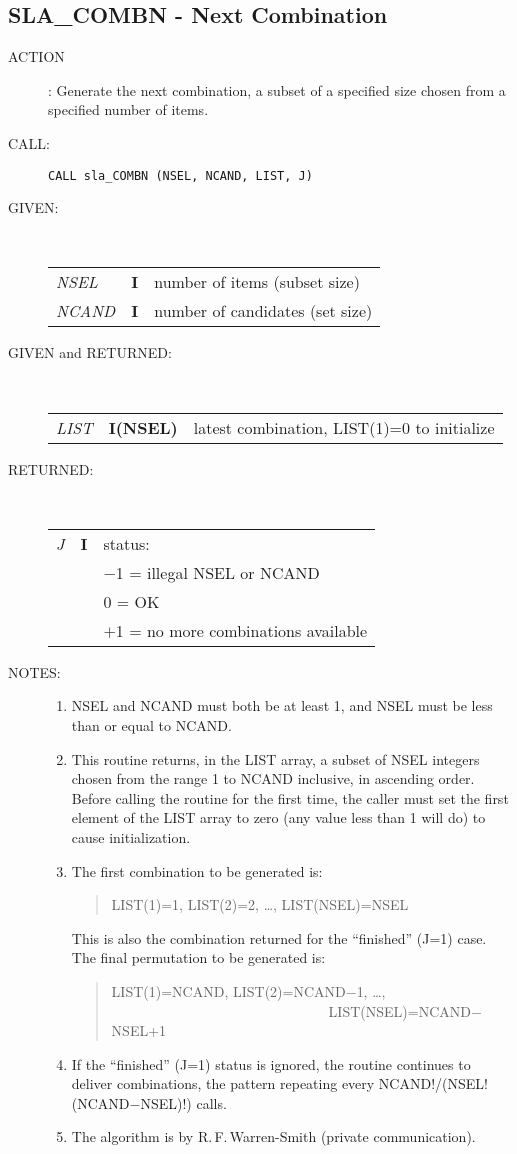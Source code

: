 \documentclass[11pt,twoside]{article}
\newcommand{\xlabel}[1]{}
\newcommand{\routine}[3]
{\hbadness=10000
  \vbox
  {
    \rule{\textwidth}{0.3mm}\\
    {\Large {\bf #1} \hfill #2 \hfill {\bf #1}}\\
    \setlength{\oldspacing}{\topsep}
    \setlength{\topsep}{0.3ex}
    \begin{description}
      #3
    \end{description}
    \setlength{\topsep}{\oldspacing}
  }
}
\renewcommand{\routine}[3]
   {
      \subsection{#1\xlabel{#1} - #2\label{#1}}
       \begin{description}
         #3
       \end{description}
   }
\newcommand{\action}[1]
{\item[ACTION]: #1}
\newcommand{\action}[1]
   {\item[ACTION:] #1}
\newcommand{\call}[1]
{\item[CALL]: \hspace{0.4em}{\tt #1}}
\newlength{\oldspacing}
\renewcommand{\call}[1]
   {
    \item[CALL:] {\tt #1}
   }
\newcommand{\args}[2]
{
  \goodbreak
  \setlength{\oldspacing}{\topsep}
  \setlength{\topsep}{0.3ex}
  \begin{description}
  \item[#1]:\\[1.5ex]
    \begin{tabular}{p{7em}p{6em}p{22em}}
      #2
    \end{tabular}
  \end{description}
  \setlength{\topsep}{\oldspacing}
}
\renewcommand{\args}[2]
   {
     \begin{description}
        \item[#1:]\\
        \begin{tabular}{p{7em}p{6em}l}
           #2
        \end{tabular}
     \end{description}
   }
\newcommand{\spec}[3]
{
  {\em {#1}} & {\bf \mbox{#2}} & {#3}
}
\newcommand{\notes}[1]
{
  \goodbreak
  \setlength{\oldspacing}{\topsep}
  \setlength{\topsep}{0.3ex}
  \begin{description}
    \item[NOTES]:
        #1
  \end{description}
  \setlength{\topsep}{\oldspacing}
}
\renewcommand{\notes}[1]
   {
      \begin{description}
         \item[NOTES:]
            #1
      \end{description}
   }
\begin{document}
\routine{SLA\_COMBN}{Next Combination}
{
 \action{Generate the next combination, a subset of a specified size chosen
         from a specified number of items.}
 \call{CALL sla\_COMBN (NSEL, NCAND, LIST, J)}
}
\args{GIVEN}
{
 \spec{NSEL}{I}{number of items (subset size)} \\
 \spec{NCAND}{I}{number of candidates (set size)}
}
\args{GIVEN and RETURNED}
{
 \spec{LIST}{I(NSEL)}{latest combination, LIST(1)=0 to initialize}
}
\args{RETURNED}
{
 \spec{J}{I}{status:} \\
 \spec{}{}{\hspace{1.5em} $-$1 = illegal NSEL or NCAND} \\
 \spec{}{}{\hspace{2.3em}    0 = OK} \\
 \spec{}{}{\hspace{1.5em} $+$1 = no more combinations available}
}
\notes
{
 \begin{enumerate}
  \item NSEL and NCAND must both be at least 1, and NSEL must be less
        than or equal to NCAND.
  \item This routine returns, in the LIST array, a subset of NSEL integers
        chosen from the range 1 to NCAND inclusive, in ascending order.
        Before calling the routine for the first time, the caller must set
        the first element of the LIST array to zero (any value less than 1
        will do) to cause initialization.
  \item The first combination to be generated is:
        \begin{verse}
            LIST(1)=1, LIST(2)=2, \ldots, LIST(NSEL)=NSEL
        \end{verse}
        This is also the combination returned for the ``finished'' (J=1) case.
        The final permutation to be generated is:
        \begin{verse}
           LIST(1)=NCAND, LIST(2)=NCAND$-$1, \ldots, \\
           ~~~~~~~~~~~~~~~~~~~~~~~~~~~~~~~LIST(NSEL)=NCAND$-$NSEL+1
        \end{verse}
  \item If the ``finished'' (J=1) status is ignored, the routine
        continues to deliver combinations, the pattern repeating
        every NCAND!/(NSEL!(NCAND$-$NSEL)!) calls.
  \item The algorithm is by R.\,F.\,Warren-Smith (private communication).
 \end{enumerate}
}
\end{document}
